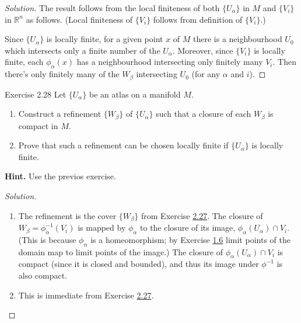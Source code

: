 \begin{proof}[Solution]\leavevmode
 The result follows from the local finiteness of both \(\{U_\alpha\}\) in \(M\) and \(\{V_i\}\) in \(\mathbb{R}^n\) as follows. (Local finiteness of \(\{V_i\}\) follows from definition of \(\{V_i\}\).)

Since \(\{U_\alpha\}\) is locally finite, for a given point $x$ of \(M\) there is a neighbourhood \(U_0\) which intersects only a finite number of the \(U_\alpha\). Moreover, since  \(\{V_i\}\) is locally finite, each \(\phi_\alpha(x)\) has a neighbourhood intersecting only finitely many \(V_i\). Then there's only finitely many of the \(W_\beta\) intersecting \(U_0\) (for any \(\alpha\) and \(i\)).

\end{proof}

\begin{thing4}{Exercise 2.28}\label{exer:2.28}\leavevmode
Let \(\{U_\alpha\}\) be an atlas on a manifold \(M\).
\begin{enumerate}[label=(\alph*)]
\item Construct a refinement \(\{W_\beta\}\) of \(\{U_\alpha\}\) such that a closure of each \(W_\beta\) is compact in \(M\).
\item Prove that such a refinement can be chosen locally finite if \(\{U_\alpha\}\) is locally finite.
\end{enumerate}
\textbf{Hint.} Use the previos exercise.
\end{thing4}

\begin{proof}[Solution]\leavevmode
\begin{enumerate}[label=(\alph*)]
\item The refinement is the cover \(\{W_\beta\}\) from Exercise \hyperref[exer:2.27]{2.27}. 
The closure of \(W_\beta=\phi^{-1}_\alpha(V_i)\) is mapped by \(\phi_\alpha\) to the closure of its image, \(\phi_\alpha(U_\alpha)\cap V_i\). (This is because  \(\phi_\alpha\) is a homeomorphism; by Exercise \hyperref[exer:1.6]{1.6} limit points of the domain map to limit points of the image.) The closure of \(\phi_\alpha(U_\alpha)\cap V_i\) is compact (since it is closed and bounded), and thus its image under \(\phi^{-1}\) is also compact.

\item This is immediate from Exercise \hyperref[exer:2.27]{2.27}.
\end{enumerate}
\end{proof}

